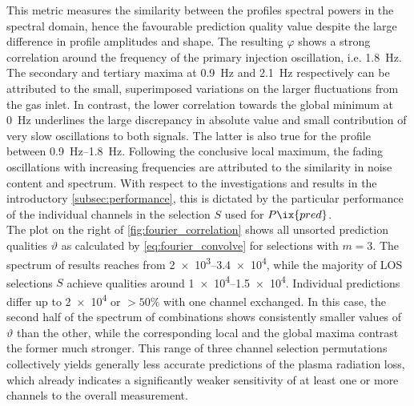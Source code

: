                 This metric measures the similarity between the profiles spectral powers in the spectral domain, hence the favourable prediction quality value despite the large difference in profile amplitudes and shape. The resulting $\varphi$ shows a strong correlation around the frequency of the primary injection oscillation, i.e. \SI{1.8}{\hertz}. The secondary and tertiary maxima at \SI{0.9}{\hertz} and \SI{2.1}{\hertz} respectively can be attributed to the small, superimposed variations on the larger fluctuations from the gas inlet. In contrast, the lower correlation towards the global minimum at \SI{0}{\hertz} underlines the large discrepancy in absolute value and small contribution of very slow oscillations to both signals. The latter is also true for the profile between \SIrange{0.9}{1.8}{\hertz}. Following the conclusive local maximum, the fading oscillations with increasing frequencies are attributed to the similarity in noise content and spectrum. With respect to the investigations and results in the introductory \cref{subsec:performance}, this is dictated by the particular performance of the individual channels in the selection $S$ used for $P\ix{pred}$.\\%
                The plot on the right of \cref{fig:fourier_correlation} shows all unsorted prediction qualities $\vartheta$ as calculated by \cref{eq:fourier_convolve} for selections with $m=3$. The spectrum of results reaches from \SIrange{2e3}{3.4e4}{\arbitraryunit}, while the majority of LOS selections $S$ achieve qualities around \SIrange{1e4}{1.5e4}{\arbitraryunit}. Individual predictions differ up to \SI{2e4}{\arbitraryunit} or $>50\%$ with one channel exchanged. In this case, the second half of the spectrum of combinations shows consistently smaller values of $\vartheta$ than the other, while the corresponding local and the global maxima contrast the former much stronger. This range of three channel selection permutations collectively yields generally less accurate predictions of the plasma radiation loss, which already indicates a significantly weaker sensitivity of at least one or more channels to the overall measurement.\\%
%
